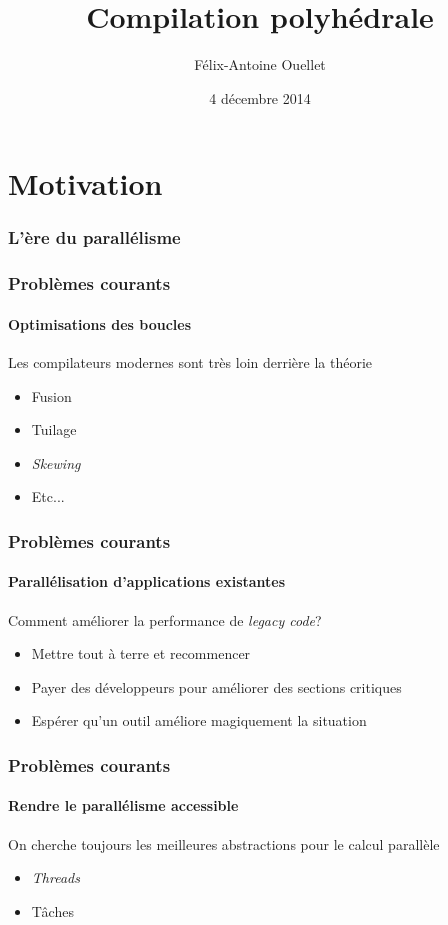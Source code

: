 \documentclass{beamer}
\author[Félix-Antoine Ouellet]{Félix-Antoine Ouellet}
\title[PolyOpt\hspace{2em}\insertframenumber/\inserttotalframenumber]{Compilation polyhédrale}
\institute{Université de Sherbrooke}
\date{4 décembre 2014}
\begin{document}
\begin{frame}
\titlepage %
\end{frame}

\begin{frame}
\tableofcontents[hideallsubsections]
\end{frame}

\section{Motivation}
\begin{frame}
\frametitle{L'ère du parallélisme}

\end{frame}

\begin{frame}
\frametitle{Problèmes courants}
\framesubtitle{Optimisations des boucles}
Les compilateurs modernes sont très loin derrière la théorie
\begin{itemize}
\item Fusion
\item Tuilage
\item \textit{Skewing}
\item Etc...
\end{itemize}
\end{frame}

\begin{frame}
\frametitle{Problèmes courants}
\framesubtitle{Parallélisation d'applications existantes}
Comment améliorer la performance de \textit{legacy code}?
\begin{itemize}
\item Mettre tout à terre et recommencer
\item Payer des développeurs pour améliorer des sections critiques
\item Espérer qu'un outil améliore magiquement la situation
\end{itemize}
\end{frame}

\begin{frame}
\frametitle{Problèmes courants}
\framesubtitle{Rendre le parallélisme accessible}
On cherche toujours les meilleures abstractions pour le calcul parallèle
\begin{itemize}
\item \textit{Threads}
\item Tâches
\end{itemize}
\end{frame}
\end{document}
